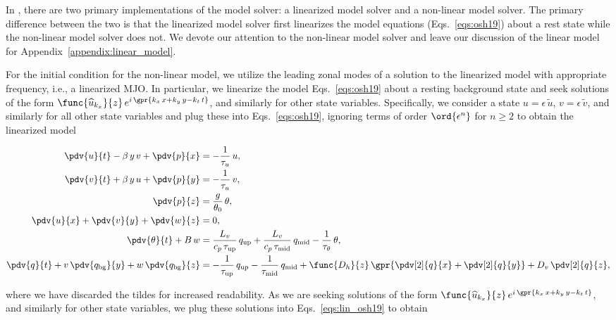 In \cite{Ogrosky19}, there are two primary implementations of the model solver: a linearized model solver and a non-linear model solver. The primary difference between the two is that the linearized model solver first linearizes the model equations (Eqs.~\ref{eqs:osh19}) about a rest state while the non-linear model solver does not. We devote our attention to the non-linear model solver and leave our discussion of the linear model for Appendix~\ref{appendix:linear_model}.

For the initial condition for the non-linear model, we utilize the leading zonal modes of a solution to the linearized model with appropriate frequency, i.e., a linearized MJO. In particular, we linearize the model Eqs.~\ref{eqs:osh19} about a resting background state and seek solutions of the form $\func{\widehat{u}_{k_x}}{z}\,e^{i\,\gpr{k_x\,x + k_y\,y - k_t\,t}}$, and similarly for other state variables. Specifically, we consider a state $u = \epsilon\,\widetilde{u}$, $v = \epsilon\,\widetilde{v}$, and similarly for all other state variables and plug these into Eqs.~\ref{eqs:osh19}, ignoring terms of order $\ord{\epsilon^n}$ for $n \geq 2$ to obtain the linearized model 

\begin{subequations}
	\begin{align}
		\pdv{u}{t} - \beta\,y\,v + \pdv{p}{x} &= -\frac{1}{\tau_u}\,u, \label{eqn:lin_zonal_wind} \\
		\pdv{v}{t} + \beta\,y\,u + \pdv{p}{y} &= -\frac{1}{\tau_u}\,v, \label{eqn:lin_merid_wind} \\
		\pdv{p}{z} &= \frac{g}{\theta_0}\,\theta, \label{eqn:lin_hydrostatic} \\
		\pdv{u}{x} + \pdv{v}{y} + \pdv{w}{z} &= 0,\\
		\pdv{\theta}{t} + B\,w &= \frac{L_v}{c_p\,\tau_{\text{up}}}\,q_{\text{up}} + \frac{L_v}{c_p\,\tau_{\text{mid}}}\,q_{\text{mid}} - \frac{1}{\tau_{\theta}}\,\theta, \label{eqn:lin_temp} \\
		\pdv{q}{t} + v\,\pdv{q_{\text{bg}}}{y} + w\,\pdv{q_{\text{bg}}}{z} &= -\frac{1}{\tau_{\text{up}}}\,q_{\text{up}} - \frac{1}{\tau_{\text{mid}}}\,q_{\text{mid}} + \func{D_h}{z}\,\gpr{\pdv[2]{q}{x} + \pdv[2]{q}{y}} + D_v\,\pdv[2]{q}{z}, \label{eqn:lin_moist}
	\end{align}
	\label{eqs:lin_osh19}
\end{subequations}

where we have discarded the tildes for increased readability. As we are seeking solutions of the form $\func{\widehat{u}_{k_x}}{z}\,e^{i\,\gpr{k_x\,x + k_y\,y - k_t\,t}}$, and similarly for other state variables, we plug these solutions into Eqs.~\ref{eqs:lin_osh19} to obtain


